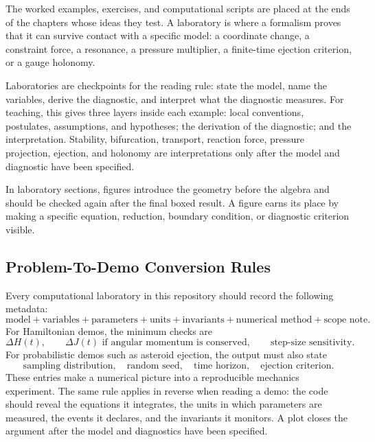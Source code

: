 The worked examples, exercises, and computational scripts are placed at the ends
of the chapters whose ideas they test. A laboratory is where a formalism proves
that it can survive contact with a specific model: a coordinate change, a
constraint force, a resonance, a pressure multiplier, a finite-time ejection
criterion, or a gauge holonomy.

Laboratories are checkpoints for the reading rule: state the model, name the
variables, derive the diagnostic, and interpret what the diagnostic measures.
For teaching, this gives three layers inside each example: local conventions,
postulates, assumptions, and hypotheses; the derivation of the diagnostic; and
the interpretation.
Stability, bifurcation, transport, reaction force, pressure projection,
ejection, and holonomy are interpretations only after the model and diagnostic
have been specified.

In laboratory sections, figures introduce the geometry before the algebra and
should be checked again after the final boxed result. A figure earns its place
by making a specific equation, reduction, boundary condition, or diagnostic
criterion visible.

\subsection*{Problem-To-Demo Conversion Rules}
\label{sec:lab-demo-rules}

Every computational laboratory in this repository should record the following
metadata:
\[
  \text{model}+\text{variables}+\text{parameters}
  +\text{units}+\text{invariants}+\text{numerical method}
  +\text{scope note}.
\]
For Hamiltonian demos, the minimum checks are
\[
  \Delta H(t),\qquad
  \Delta J(t) \text{ if angular momentum is conserved},\qquad
  \text{step-size sensitivity}.
\]
For probabilistic demos such as asteroid ejection, the output must also state
\[
  \text{sampling distribution},\quad
  \text{random seed},\quad
  \text{time horizon},\quad
  \text{ejection criterion}.
\]
These entries make a numerical picture into a reproducible mechanics
experiment. The same rule applies in reverse when reading a demo: the code
should reveal the equations it integrates, the units in which parameters are
measured, the events it declares, and the invariants it monitors. A plot closes
the argument after the model and diagnostics have been specified.
